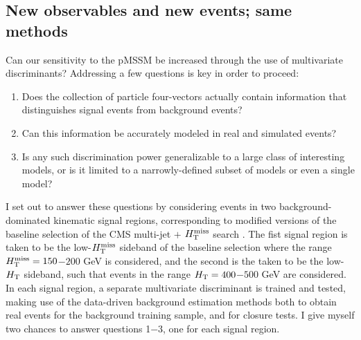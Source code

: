 \subsection{New observables and new events; same methods}
Can our sensitivity to the pMSSM be increased through the use of multivariate discriminants? Addressing a few questions is key in order to proceed: 
\begin{enumerate}
\item Does the collection of particle four-vectors actually contain information that distinguishes signal events from background events?
\item Can this information be accurately modeled in real and simulated events?
\item Is any such discrimination power generalizable to a large class of interesting models, or is it limited to a narrowly-defined subset of models or even a single model?
\end{enumerate}
I set out to answer these questions by considering events in two background-dominated kinematic signal regions, corresponding to modified versions of the baseline selection of the CMS multi-jet $+$ $H_{\text{T}}^{\rm miss}$ search \cite{Khachatryan:2016kdk}. The fist signal region is taken to be the low-$H_{\text{T}}^{\rm miss}$ sideband of the \cite{Khachatryan:2016kdk} baseline selection where the range $H_{\text{T}}^{\rm miss}=150$$-$$200$ GeV is considered, and the second is the taken to be the low-$H_{\rm T}$  sideband, such that events in the range $H_{\rm T}=400$$-$$500$ GeV are considered. In each signal region, a separate multivariate discriminant is trained and tested, making use of the data-driven background estimation methods both to obtain real events for the background training sample, and for closure tests. I give myself two chances to answer questions 1$-$3, one for each signal region.

